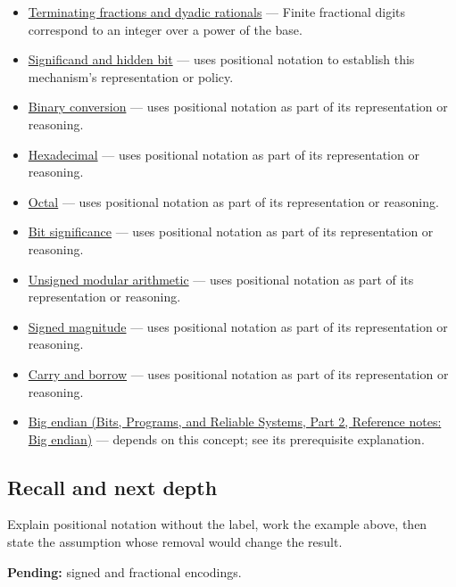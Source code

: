 \begin{itemize}
\item
  \hyperref[appendix-2a2f1b74bdd3]{Terminating fractions and dyadic rationals} --- Finite fractional digits correspond to an integer over a power of the base.
\item
  \hyperref[appendix-a24fd710cf67]{Significand and hidden bit} --- uses positional notation to establish this mechanism's representation or policy.
\item
  \hyperref[appendix-dc552784a2c0]{Binary conversion} --- uses positional notation as part of its representation or reasoning.
\item
  \hyperref[appendix-6b8075763724]{Hexadecimal} --- uses positional notation as part of its representation or reasoning.
\item
  \hyperref[appendix-17fc1bc8b305]{Octal} --- uses positional notation as part of its representation or reasoning.
\item
  \hyperref[appendix-280445746493]{Bit significance} --- uses positional notation as part of its representation or reasoning.
\item
  \hyperref[appendix-c99977d88b33]{Unsigned modular arithmetic} --- uses positional notation as part of its representation or reasoning.
\item
  \hyperref[appendix-ce20506c8532]{Signed magnitude} --- uses positional notation as part of its representation or reasoning.
\item
  \hyperref[appendix-d52d5f78ffd1]{Carry and borrow} --- uses positional notation as part of its representation or reasoning.
\item
  \href{../01-Bits-Programs-and-Reliable-Systems-P02/main.pdf\#appendix-92e040df969a}{Big endian (Bits, Programs, and Reliable Systems, Part 2, Reference notes: Big endian)} --- depends on this concept; see its prerequisite explanation.
\end{itemize}

\subsection{Recall and next depth}\label{appendix-83c3f28f7bda-recall-and-next-depth}

\hypertarget{appendix-83c3f28f7bda-recall-and-next-depth}{}

Explain positional notation without the label, work the example above, then state the assumption whose removal would change the result.

\textbf{Pending:} signed and fractional encodings.

